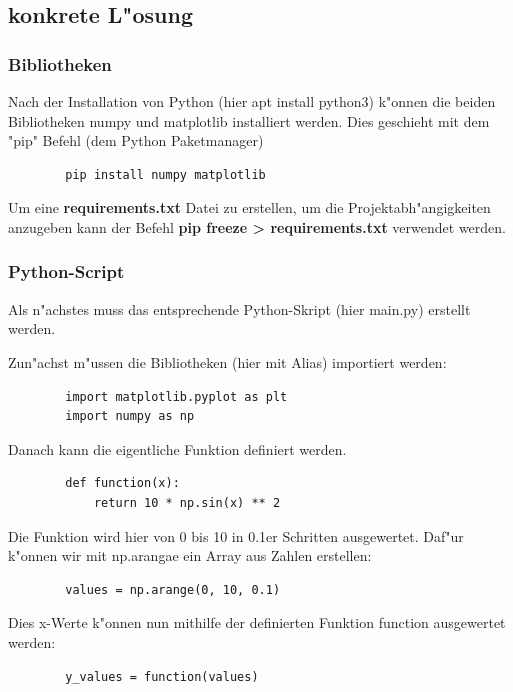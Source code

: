 \documentclass[a4paper,11pt,titlepage]{article}
\begin{document}
    \subsection{konkrete L"osung}

    \subsubsection{Bibliotheken}
    Nach der Installation von Python (hier apt install python3) k"onnen die beiden Bibliotheken numpy und matplotlib installiert werden. Dies geschieht mit dem "pip" Befehl (dem Python Paketmanager)
    \begin{lstlisting}
        pip install numpy matplotlib
    \end{lstlisting}
    Um eine \textbf{requirements.txt} Datei zu erstellen, um die Projektabh"angigkeiten anzugeben kann der Befehl \textbf{pip freeze > requirements.txt} verwendet werden.

    \subsubsection{Python-Script}
    Als n"achstes muss das entsprechende Python-Skript (hier main.py) erstellt werden.

    Zun"achst m"ussen die Bibliotheken (hier mit Alias) importiert werden:
    \begin{lstlisting}
        import matplotlib.pyplot as plt
        import numpy as np
    \end{lstlisting}
    Danach kann die eigentliche Funktion definiert werden.
    \begin{lstlisting}
        def function(x):
            return 10 * np.sin(x) ** 2
    \end{lstlisting}
    Die Funktion wird hier von 0 bis 10 in 0.1er Schritten ausgewertet. Daf"ur k"onnen wir mit np.arangae ein Array aus Zahlen erstellen:
    \begin{lstlisting}
        values = np.arange(0, 10, 0.1)
    \end{lstlisting}
    Dies x-Werte k"onnen nun mithilfe der definierten Funktion function ausgewertet werden:
    \begin{lstlisting}
        y_values = function(values)
    \end{lstlisting}
\end{document}
